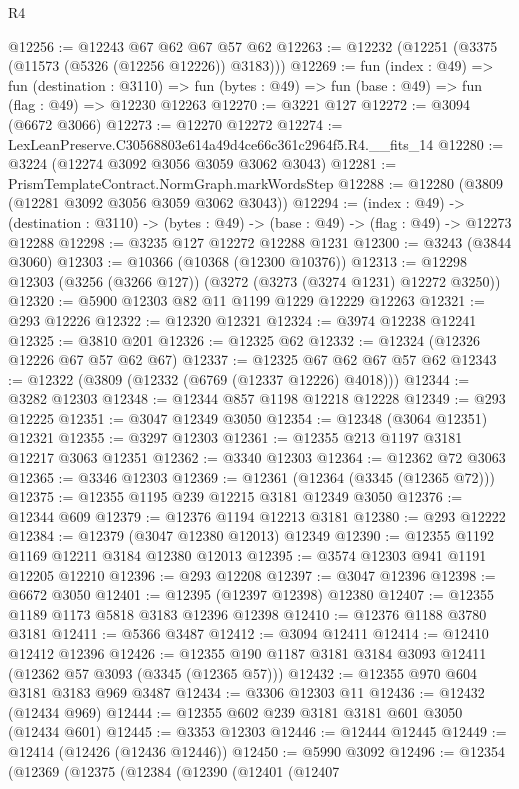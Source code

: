 \begin{lexlean}{R4}
\begin{coremodule}
@12256 := @12243 @67 @62 @67 @57 @62
@12263 := @12232 (@12251 (@3375 (@11573 (@5326 (@12256 @12226)) @3183)))
@12269 := fun (index : @49) =>
  fun (destination : @3110) =>
  fun (bytes : @49) => fun (base : @49) => fun (flag : @49) => @12230 @12263
@12270 := @3221 @127
@12272 := @3094 (@6672 @3066)
@12273 := @12270 @12272
@12274 := LexLeanPreserve.C30568803e614a49d4ce66c361c2964f5.R4.__fits_14
@12280 := @3224 (@12274 @3092 @3056 @3059 @3062 @3043)
@12281 := PrismTemplateContract.NormGraph.markWordsStep
@12288 := @12280 (@3809 (@12281 @3092 @3056 @3059 @3062 @3043))
@12294 := (index : @49) ->
  (destination : @3110) -> (bytes : @49) -> (base : @49) -> (flag : @49) -> @12273 @12288
@12298 := @3235 @127 @12272 @12288 @1231
@12300 := @3243 (@3844 @3060)
@12303 := @10366 (@10368 (@12300 @10376))
@12313 := @12298 @12303 (@3256 (@3266 @127)) (@3272 (@3273 (@3274 @1231) @12272 @3250))
@12320 := @5900 @12303 @82 @11 @1199 @1229 @12229 @12263
@12321 := @293 @12226
@12322 := @12320 @12321
@12324 := @3974 @12238 @12241
@12325 := @3810 @201
@12326 := @12325 @62
@12332 := @12324 (@12326 @12226 @67 @57 @62 @67)
@12337 := @12325 @67 @62 @67 @57 @62
@12343 := @12322 (@3809 (@12332 (@6769 (@12337 @12226) @4018)))
@12344 := @3282 @12303
@12348 := @12344 @857 @1198 @12218 @12228
@12349 := @293 @12225
@12351 := @3047 @12349 @3050
@12354 := @12348 (@3064 @12351) @12321
@12355 := @3297 @12303
@12361 := @12355 @213 @1197 @3181 @12217 @3063 @12351
@12362 := @3340 @12303
@12364 := @12362 @72 @3063
@12365 := @3346 @12303
@12369 := @12361 (@12364 (@3345 (@12365 @72)))
@12375 := @12355 @1195 @239 @12215 @3181 @12349 @3050
@12376 := @12344 @609
@12379 := @12376 @1194 @12213 @3181
@12380 := @293 @12222
@12384 := @12379 (@3047 @12380 @12013) @12349
@12390 := @12355 @1192 @1169 @12211 @3184 @12380 @12013
@12395 := @3574 @12303 @941 @1191 @12205 @12210
@12396 := @293 @12208
@12397 := @3047 @12396
@12398 := @6672 @3050
@12401 := @12395 (@12397 @12398) @12380
@12407 := @12355 @1189 @1173 @5818 @3183 @12396 @12398
@12410 := @12376 @1188 @3780 @3181
@12411 := @5366 @3487
@12412 := @3094 @12411
@12414 := @12410 @12412 @12396
@12426 := @12355 @190 @1187 @3181 @3184 @3093 @12411 (@12362 @57 @3093 (@3345 (@12365 @57)))
@12432 := @12355 @970 @604 @3181 @3183 @969 @3487
@12434 := @3306 @12303 @11
@12436 := @12432 (@12434 @969)
@12444 := @12355 @602 @239 @3181 @3181 @601 @3050 (@12434 @601)
@12445 := @3353 @12303
@12446 := @12444 @12445
@12449 := @12414 (@12426 (@12436 @12446))
@12450 := @5990 @3092
@12496 := @12354
    (@12369
      (@12375
        (@12384
          (@12390
            (@12401
              (@12407

\end{coremodule}
\end{lexlean}
